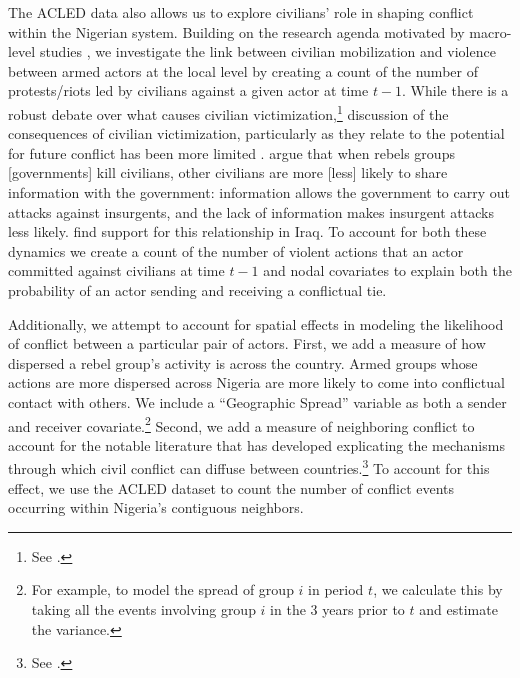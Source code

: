 The ACLED data also allows us to explore civilians' role in shaping conflict within the Nigerian system.  Building on the research agenda motivated by macro-level studies \citep{%
tarrow:1994, tucker:2007,chenoweth:stephan:2011}, we investigate the link between civilian mobilization and violence between armed actors at the local level by creating a count of the number of protests/riots led by civilians against a given actor at time $t-1$. While there is a robust debate over what causes civilian victimization,\footnote{See \citet{humphreys:weinstein:2006, downes:2006, kalyvas:2006, prorok:appel:2014}.} discussion of the consequences of civilian victimization, particularly as they relate to the potential for future conflict has been more limited \citep{hultman:2007, raleigh:2012}. \citet{berman:matanock:2015} argue that when rebels groups [governments] kill civilians, other civilians are more [less] likely to share information with the government: information allows the government to carry out attacks against insurgents, and the lack of information makes insurgent attacks less likely. \citet{condra:shapiro:2012} find support for this relationship in Iraq. To account for both these dynamics we create a count of the number of violent actions that an actor committed against civilians at time $t-1$ and nodal covariates to explain both the probability of an actor sending and receiving a conflictual tie. 

Additionally, we attempt to account for spatial effects in modeling the likelihood of conflict between a particular pair of actors. First, we add a measure of how dispersed a rebel group's activity is across the country. Armed groups whose actions are more dispersed across Nigeria are more likely to come into conflictual contact with others. We include a ``Geographic Spread'' variable as both a sender and receiver covariate.\footnote{For example, to model the spread of group $i$ in period $t$, we calculate this by taking all the events involving group $i$ in the 3 years prior to $t$ and estimate the variance.}  Second, we add a measure of neighboring conflict to account for the notable literature that has developed explicating the mechanisms through which civil conflict can diffuse between countries.\footnote{See \citet{salehyan:gleditsch:2007,metternich:etal:2017, braithwaite:2010a, beardsley:2011}.} To account for this effect, we use the ACLED dataset to count the number of conflict events occurring within Nigeria's contiguous neighbors. 

